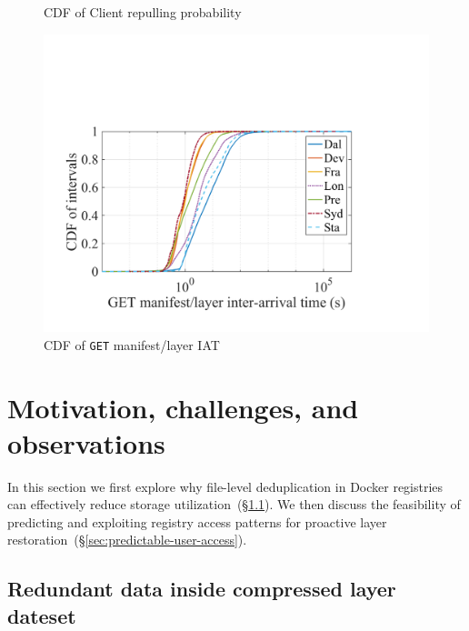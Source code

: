 \begin{figure}[t]
\begin{minipage}{0.265\textwidth}
                \caption{CDF of Client repulling probability}%
                \label{fig:client-repull-cdf}
        \end{minipage}%
\hspace{1mm}
        \begin{minipage}{0.27\textwidth}
        \centering
        \includegraphics[width=\textwidth]{graphs/GML-intervals.pdf}
        \caption{CDF of \texttt{GET} manifest/layer IAT}
        \label{fig:intervals}
        \end{minipage}
\end{figure}



\section{Motivation, challenges, and observations}
\label{sec:dataset-analysis}

In this section we first explore why file-level deduplication in Docker
registries can effectively reduce storage
utilization~(\S\ref{sec:inter-layer-deduplication}).
%
We then discuss the feasibility of predicting and exploiting registry access
patterns for proactive layer restoration~(\S\ref{sec:predictable-user-access}).

\subsection{Redundant data inside compressed layer dateset}
\label{sec:inter-layer-deduplication}

